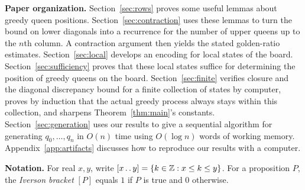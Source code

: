 \medskip
\noindent\textbf{Paper organization.} 
Section~\ref{sec:rows} proves some useful lemmas about greedy queen positions. 
Section~\ref{sec:contraction} uses these lemmas to turn the bound on lower 
diagonals into a recurrence for the number of upper queens up to the $n$th column. 
A contraction argument then yields the stated golden-ratio estimates.
Section~\ref{sec:local} develops an encoding for local states of the board.
Section~\ref{sec:sufficiency} proves that these local states suffice for determining the position of greedy queens on the board.
Section~\ref{sec:finite} verifies closure and the diagonal discrepancy bound for
a finite collection of states by computer, proves by induction
that the actual greedy process always stays within this collection, and
sharpens Theorem~\ref{thm:main}'s constants.
Section~\ref{sec:generation} uses our results to give a sequential
algorithm for generating $q_0,\ldots,q_n$ in $O(n)$ time using
$O(\log n)$ words of working memory.
Appendix~\ref{app:artifacts} discusses how to reproduce our results with a computer.

\medskip
\noindent\textbf{Notation.} For real $x,y$, write $[x\mathinner{\ldotp\ldotp} y]=\{k\in\mathbb Z: x\le k\le y\}$. For a proposition $P$, the \emph{Iverson bracket}
$[P]$ equals $1$ if $P$ is true and $0$ otherwise.